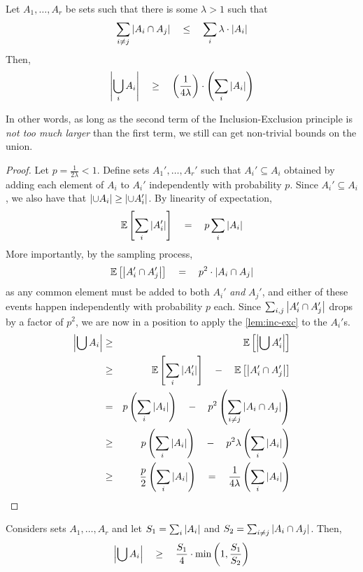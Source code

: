 \begin{lemma}\label{lem:str-inc-exc}
Let $A_1,\dots, A_r$ be sets such that there is some $\lambda > 1$ such that
\[
\sum_{i\neq j} \left|A_i \cap A_j\right| \quad \leq \quad \sum_i \lambda \cdot \left|A_i\right|
\]
Then, 
\[
\left|\bigcup_i A_i\right| \quad \geq \quad \left(\frac{1}{4\lambda}\right) \cdot \left(\sum_i \left|A_i\right|\right)
\]
\end{lemma}

In other words, as long as the second term of the Inclusion-Exclusion principle is \emph{not too much larger} than the first term, we still can get non-trivial bounds on the union. 

\begin{proof}
Let $p = \frac{1}{2\lambda} < 1$. 
Define sets $A_1',\dots, A_r'$ such that $A_i' \subseteq A_i$ obtained by adding each element of $A_i$ to $A_i'$ independently with probability $p$. 
Since $A_i' \subseteq A_i$, we also have that $\left|\cup A_i\right| \geq \left|\cup  A_i'\right|$. 
By linearity of expectation, 
\[
\mathbb{E}\left[\sum_i \left|A_i'\right|\right] \quad = \quad p \sum_{i} \left|A_i\right| 
\]
More importantly, by the sampling process,
\[
\mathbb{E}\left[\left|A_i' \cap A_j'\right|\right] \quad = \quad p^2 \cdot \left|A_i \cap A_j\right|
\]
as any common element must be added to both $A_i'$ \emph{and} $A_j'$, and either of these events happen independently with probability $p$ each. 
Since $\sum_{i,j}\left|A_i' \cap A_j'\right|$ drops by a factor of $p^2$, we are now in a position to apply the \autoref{lem:inc-exc} to the $A_i'$s. 
\begin{eqnarray*}
\left|\bigcup A_i\right| & \geq &  \mathbb{E}\left[\left|\bigcup A_i'\right|\right]\\
& \geq & \mathbb{E}\left[\sum_i \left|A_i'\right|\right] \quad - \quad \mathbb{E}\left[\left|A_i' \cap A_j'\right|\right]\\
& = & p \left(\sum_i \left|A_i\right|\right) \quad - \quad p^2\left(\sum_{i\neq j}\left|A_i \cap A_j\right|\right)\\
& \geq & p \left(\sum_i \left|A_i\right|\right) \quad - \quad p^2 \lambda \left(\sum_i \left|A_i\right|\right)\\
& \geq & \frac{p}{2} \left(\sum_i \left|A_i\right|\right) \quad = \quad \frac{1}{4\lambda} \left(\sum_i \left|A_i\right|\right)
\end{eqnarray*}
\end{proof}

\begin{corollary}\label{cor:inc-exc-str}
Considers sets $A_1,\dots, A_r$  and let $S_1 = \sum_i \left|A_i\right|$ and $S_2 = \sum_{i\neq j} \left|A_i \cap A_j\right|$. 
Then, 
\[
\left|\bigcup A_i\right| \quad \geq \quad \frac{S_1}{4} \cdot \min\left(1,\frac{S_1}{S_2}\right)
\]
\end{corollary}

